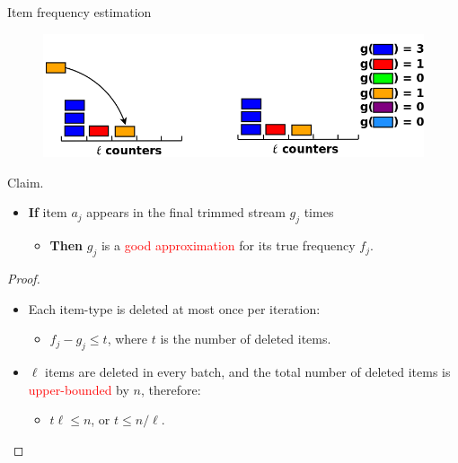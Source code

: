 \documentclass[first=dgreen,second=purple,logo=redque]{aaltoslides}
\begin{document}
\begin{frame}[allowframebreaks=1]{Item frequency estimation}
\framebreak

\begin{figure}
  \includegraphics[scale=0.3]{plots/fi6}
 \label{fig:fi5}
\end{figure}

\framebreak

\textcolor{dgreen}{Claim.}

\begin{itemize}
\item \textbf{If} item $a_{j}$ appears in the \textcolor{dgreen}{final} trimmed
stream $g_{j}$ times
\begin{itemize}
  \item \textbf{Then} $g_{j}$ is a \textcolor{red}{good approximation} for its
  true frequency $f_{j}$.%
\end{itemize}         
\end{itemize}

\begin{proof}
\begin{itemize}
   \item Each item-type is deleted \textcolor{dgreen}{at most} once per iteration:
   \begin{itemize} \item $f_{j} - g_{j} \leq t$, where $t$ is the
   number of deleted items.\end{itemize}



   \item $\ell$ items are deleted in every batch, and the total number of
   deleted items is \textcolor{red}{upper-bounded} by $n$, therefore:
   \begin{itemize} \item $t\ell \leq n$, or $t \leq n/\ell$\cite{Misra82}.\end{itemize} 
\end{itemize}
\end{proof}


\end{frame}
\end{document}
